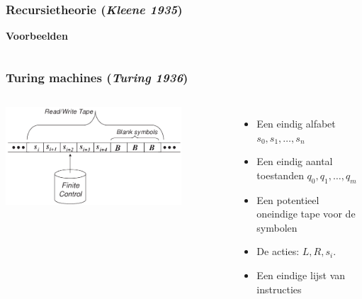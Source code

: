 \documentclass[handout]{beamer}
\begin{document}
\begin{frame}
    \frametitle{Recursietheorie (\emph{Kleene 1935})}
    \textbf{Voorbeelden}
    \begin{columns}
        \end{columns}
        \vspace{1cm}
\end{frame}

\begin{frame}
    \frametitle{Turing machines (\emph{Turing 1936})}
    \begin{columns}
            \includegraphics[width=0.8\textwidth]{tm.png}
            \begin{itemize}
                \item<2-> Een eindig alfabet $s_0, s_1, \ldots, s_n$
                \item<3-> Een eindig aantal toestanden $q_0, q_1, \ldots, q_m$
                \item<4-> Een potentieel oneindige tape voor de symbolen
                \item<5-> De acties: $L, R, s_i$.
                \item<6-> Een eindige lijst van instructies
            \end{itemize}
    \end{columns}
\end{frame}
\end{document}
